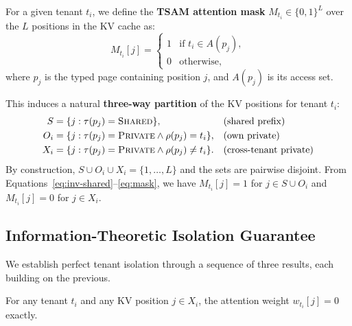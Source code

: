 For a given tenant $t_i$, we define the \textbf{TSAM attention mask} $M_{t_i} \in \{0,1\}^L$
over the $L$ positions in the KV cache as:
\begin{equation}
    M_{t_i}[j] = \begin{cases}
        1 & \text{if } t_i \in A(p_j), \\
        0 & \text{otherwise},
    \end{cases}
    \label{eq:mask}
\end{equation}
where $p_j$ is the typed page containing position $j$, and $A(p_j)$ is its access set.

This induces a natural \textbf{three-way partition} of the KV positions for tenant $t_i$:
\begin{align}
    S      &= \{j : \tau(p_j) = \textsc{Shared}\},   && \text{(shared prefix)} \\
    O_i    &= \{j : \tau(p_j) = \textsc{Private} \wedge \rho(p_j) = t_i\}, && \text{(own private)} \\
    X_i    &= \{j : \tau(p_j) = \textsc{Private} \wedge \rho(p_j) \neq t_i\}. && \text{(cross-tenant private)}
\end{align}
By construction, $S \cup O_i \cup X_i = \{1, \ldots, L\}$ and the sets are pairwise disjoint.
From Equations~\eqref{eq:inv-shared}--\eqref{eq:mask}, we have $M_{t_i}[j] = 1$ for
$j \in S \cup O_i$ and $M_{t_i}[j] = 0$ for $j \in X_i$.

\subsection{Information-Theoretic Isolation Guarantee}
\label{sec:formal:isolation}

We establish perfect tenant isolation through a sequence of three results, each building
on the previous.

\begin{lemma}
\label{lem:zero-weight}
For any tenant $t_i$ and any KV position $j \in X_i$, the attention weight
$w_{t_i}[j] = 0$ exactly.
\end{lemma}

